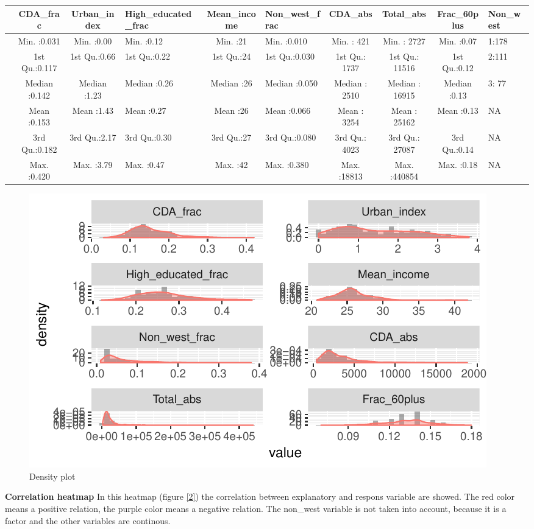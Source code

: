 \documentclass[11pt,]{article}
\begin{document}
\begin{longtable}[]{@{}lcclclcccl@{}}
\toprule
& CDA\_frac & Urban\_index & High\_educated\_frac & Mean\_income &
Non\_west\_frac & CDA\_abs & Total\_abs & Frac\_60plus &
Non\_west\tabularnewline
\midrule
\endhead
& Min. :0.031 & Min. :0.00 & Min. :0.12 & Min. :21 & Min. :0.010 & Min.
: 421 & Min. : 2727 & Min. :0.07 & 1:178\tabularnewline
& 1st Qu.:0.117 & 1st Qu.:0.66 & 1st Qu.:0.22 & 1st Qu.:24 & 1st
Qu.:0.030 & 1st Qu.: 1737 & 1st Qu.: 11516 & 1st Qu.:0.12 &
2:111\tabularnewline
& Median :0.142 & Median :1.23 & Median :0.26 & Median :26 & Median
:0.050 & Median : 2510 & Median : 16915 & Median :0.13 & 3:
77\tabularnewline
& Mean :0.153 & Mean :1.43 & Mean :0.27 & Mean :26 & Mean :0.066 & Mean
: 3254 & Mean : 25162 & Mean :0.13 & NA\tabularnewline
& 3rd Qu.:0.182 & 3rd Qu.:2.17 & 3rd Qu.:0.30 & 3rd Qu.:27 & 3rd
Qu.:0.080 & 3rd Qu.: 4023 & 3rd Qu.: 27087 & 3rd Qu.:0.14 &
NA\tabularnewline
& Max. :0.420 & Max. :3.79 & Max. :0.47 & Max. :42 & Max. :0.380 & Max.
:18813 & Max. :440854 & Max. :0.18 & NA\tabularnewline
\bottomrule
\end{longtable}

\begin{figure}[H]

{\centering \includegraphics{Report_files/figure-latex/demographics_data-1} 

}

\caption{\label{1} Density plot}\label{fig:demographics_data}
\end{figure}

\textbf{Correlation heatmap} In this heatmap (figure \ref{2}) the
correlation between explanatory and respons variable are showed. The red
color means a positive relation, the purple color means a negative
relation. The non\_west variable is not taken into account, because it
is a factor and the other variables are continous.
\end{document}

